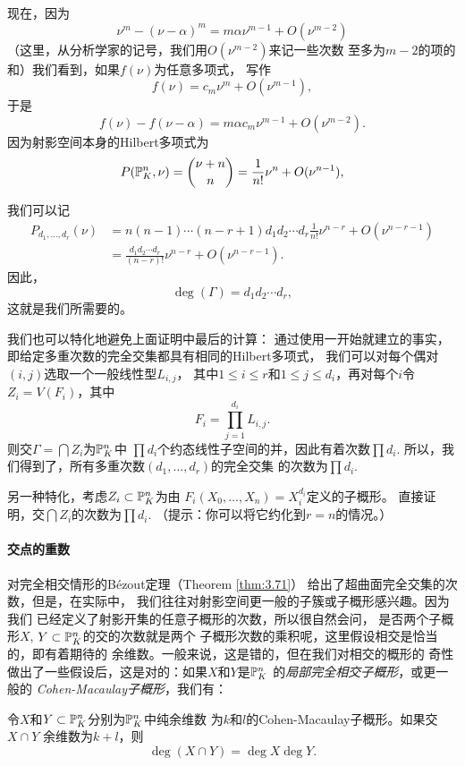 \nottran

现在，因为
\[
	\nu^m-(\nu-\alpha)^m=m\alpha\nu^{m-1}+O(\nu^{m-2})
\]
（这里，从分析学家的记号，我们用$O(\nu^{m-2})$来记一些次数
至多为$m-2$的项的和）我们看到，如果$f(\nu)$为任意多项式，
写作
\[
	f(\nu)=c_m\nu^m+O(\nu^{m-1}),
\]
于是
\[
	f(\nu)-f(\nu-\alpha)=m\alpha c_m\nu^{m-1}+O(\nu^{m-2}).
\]
因为射影空间本身的Hilbert多项式为
\[
	P(\P_K^n,\nu)=\binom{\nu+n}{n}=\frac{1}{n!}\nu^n+
	O(\nu^{n-1}),
\]


我们可以记
\begin{align*}
P_{d_1,\dots,d_r}(\nu)&=n(n-1)\cdots (n-r+1)d_1d_2\cdots
	d_r\frac 1{n!} \nu^{n-r}+O(\nu^{n-r-1})\\
&=\frac{d_1d_2\cdots d_r}{(n-r)!}\nu^{n-r}+O(\nu^{n-r-1}).
\end{align*}
因此，
\[
	\deg(\Gamma)=d_1d_2\cdots d_r,
\]
这就是我们所需要的。

我们也可以特化地避免上面证明中最后的计算：
通过使用一开始就建立的事实，
即给定多重次数的完全交集都具有相同的Hilbert多项式，
我们可以对每个偶对$(i,j)$选取一个一般线性型$L_{i,j}$，
其中$1\leq i\leq r$和$1\leq j\leq d_i$，再对每个$i$令
$Z_i=V(F_i)$，其中
\[
	F_i=\prod_{j=1}^{d_i}L_{i,j}.
\]
则交$\Gamma=\bigcap Z_i$为$\P_K^n$中
$\prod d_i$个约态线性子空间的并，因此有着次数$\prod d_i$.
所以，我们得到了，所有多重次数$(d_1,\dots,d_r)$的完全交集
的次数为$\prod d_i$.

\begin{exe}\label{exe:3.77}
另一种特化，考虑$Z_i\subset \P_K^n$为由
$F_i(X_0,\dots,X_n)=X_i^{d_i}$定义的子概形。
直接证明，交$\bigcap Z_i$的次数为$\prod d_i$. 
（提示：你可以将它约化到$r=n$的情况。）
\end{exe}

\paragraph*{交点的重数}
对完全相交情形的B\'ezout定理（Theorem \ref{thm:3.71}）
给出了超曲面完全交集的次数，但是，在实际中，
我们往往对射影空间更一般的子簇或子概形感兴趣。因为我们
已经定义了射影开集的任意子概形的次数，所以很自然会问，
是否两个子概形$X$, $Y\subset \P_K^n$的交的次数就是两个
子概形次数的乘积呢，这里假设相交是恰当的，即有着期待的
余维数。一般来说，这是错的，但在我们对相交的概形的
奇性做出了一些假设后，这是对的：如果$X$和$Y$是$\P_K^n$
的\textit{局部完全相交子概形}，或更一般的
\textit{Cohen-Macaulay子概形}，我们有：

\begin{thm}
\label{thm:3.78}
令$X$和$Y\subset \P_K^n$分别为$\P_K^n$中纯余维数
为$k$和$l$的Cohen-Macaulay子概形。如果交$X\cap Y$
余维数为$k+l$，则
\[
	\deg(X\cap Y)=\deg X\deg Y.
\]
\end{thm}

